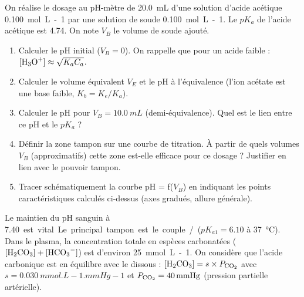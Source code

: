 \documentclass[11pt]{article}
\begin{document}
\begin{exercice}
On réalise le dosage au pH-mètre de \SI{20,0}{mL} d'une solution d'acide acétique  \SI{0,100}{mol.L-1} par une solution de soude  \SI{0,100}{mol.L-1}. Le $pK_a$ de l'acide acétique est \num{4,74}. On note $V_B$ le volume de soude ajouté.
\begin{enumerate}
    \item Calculer le pH initial ($V_B = 0$). On rappelle que pour un acide faible : $[\ce{H3O+}] \approx \sqrt{K_a C_a}$.
    \item Calculer le volume équivalent $V_E$ et le pH à l'équivalence (l'ion acétate est une base faible, $K_b = K_e/K_a$).
    \item Calculer le pH pour $V_B = \SI{10,0}{mL}$ (demi-équivalence). Quel est le lien entre ce pH et le $pK_a$ ?
    \item Définir la zone tampon sur une courbe de titration. À partir de quels volumes $V_B$ (approximatifs) cette zone est-elle efficace pour ce dosage ? Justifier en lien avec le pouvoir tampon.
    \item Tracer schématiquement la courbe pH = f($V_B$) en indiquant les points caractéristiques calculés ci-dessus (axes gradués, allure générale).
\end{enumerate}
\end{exercice}

\begin{exercice}
Le maintien du pH sanguin à \SI{7,40} est vital. Le principal tampon est le couple / ($pK_{a1} = \num{6,10}$ à \SI{37}{\celsius}). Dans le plasma, la concentration totale en espèces carbonatées ($[\ce{H2CO3}] + [\ce{HCO3-}]$) est d'environ \SI{25}{mmol.L-1}. On considère que l'acide carbonique  est en équilibre avec le  dissous : $[\ce{H2CO3}] = s \times P_{\ce{CO2}}$ avec $s = \SI{0,030}{mmol.L-1.mmHg-1}$ et $P_{\ce{CO2}} = \SI{40}{mmHg}$ (pression partielle artérielle).
\end{exercice}
\end{document}
